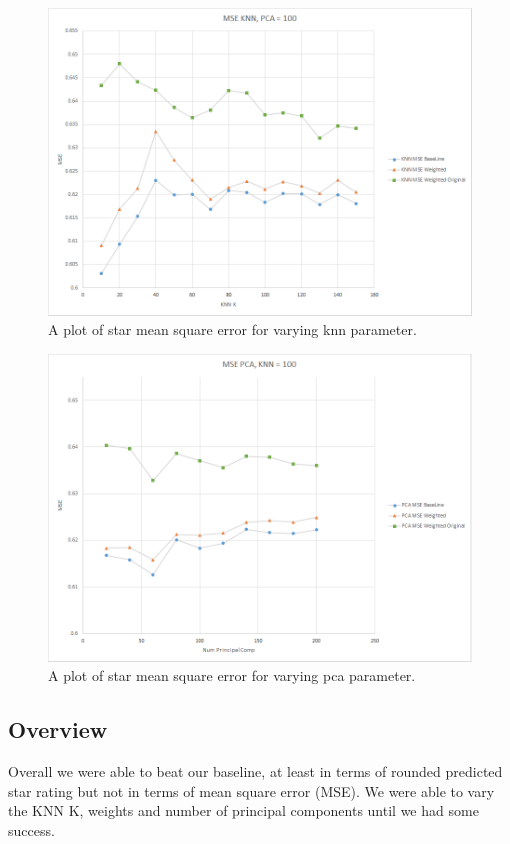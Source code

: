 \documentclass[10pt,twocolumn,letterpaper]{article}
\begin{document}
\begin{figure}[t]
\begin{center}
   \includegraphics[width=0.9\linewidth]{knnMSE.png}
\end{center}
   \caption{A plot of star mean square error for varying knn parameter.}
\label{fig:knnMSE}
\end{figure}

\begin{figure}[t]
\begin{center}
   \includegraphics[width=0.9\linewidth]{pcaMSE.png}
\end{center}
   \caption{A plot of star mean square error for varying pca parameter.}
\label{fig:pcaMSE}
\end{figure}

\subsection{Overview}
Overall we were able to beat our baseline, at least in terms of rounded predicted star rating but not in terms of mean square error (MSE). We were able to vary the KNN K, weights and number of principal components until we had some success.
\end{document}
